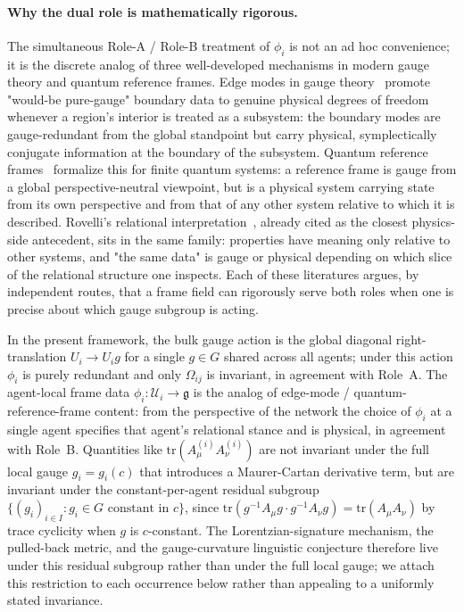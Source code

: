 \documentclass[11pt]{article}
\begin{document}
\paragraph{Why the dual role is mathematically rigorous.}
\label{sec:dual_role_rigor}
The simultaneous Role-A / Role-B treatment of $\phi_i$ is not an ad hoc convenience; it is the discrete analog of three well-developed mechanisms in modern gauge theory and quantum reference frames. Edge modes in gauge theory~\cite{DonnellyFreidel2016} promote "would-be pure-gauge" boundary data to genuine physical degrees of freedom whenever a region's interior is treated as a subsystem: the boundary modes are gauge-redundant from the global standpoint but carry physical, symplectically conjugate information at the boundary of the subsystem. Quantum reference frames~\cite{BartlettRudolphSpekkens2007, Vanrietvelde2020} formalize this for finite quantum systems: a reference frame is gauge from a global perspective-neutral viewpoint, but is a physical system carrying state from its own perspective and from that of any other system relative to which it is described. Rovelli's relational interpretation~\cite{Rovelli1996}, already cited as the closest physics-side antecedent, sits in the same family: properties have meaning only relative to other systems, and "the same data" is gauge or physical depending on which slice of the relational structure one inspects. Each of these literatures argues, by independent routes, that a frame field can rigorously serve both roles when one is precise about which gauge subgroup is acting.

In the present framework, the bulk gauge action is the global diagonal right-translation $U_i \to U_i g$ for a single $g \in G$ shared across all agents; under this action $\phi_i$ is purely redundant and only $\Omega_{ij}$ is invariant, in agreement with Role~A. The agent-local frame data $\phi_i: \mathcal{U}_i \to \mathfrak{g}$ is the analog of edge-mode / quantum-reference-frame content: from the perspective of the network the choice of $\phi_i$ at a single agent specifies that agent's relational stance and is physical, in agreement with Role~B. Quantities like $\mathrm{tr}(A^{(i)}_\mu A^{(i)}_\nu)$ are not invariant under the full local gauge $g_i = g_i(c)$ that introduces a Maurer-Cartan derivative term, but are invariant under the constant-per-agent residual subgroup $\{(g_i)_{i \in I} : g_i \in G \text{ constant in } c\}$, since $\mathrm{tr}(g^{-1}A_\mu g \cdot g^{-1}A_\nu g) = \mathrm{tr}(A_\mu A_\nu)$ by trace cyclicity when $g$ is $c$-constant. The Lorentzian-signature mechanism, the pulled-back metric, and the gauge-curvature linguistic conjecture therefore live under this residual subgroup rather than under the full local gauge; we attach this restriction to each occurrence below rather than appealing to a uniformly stated invariance.
\end{document}

